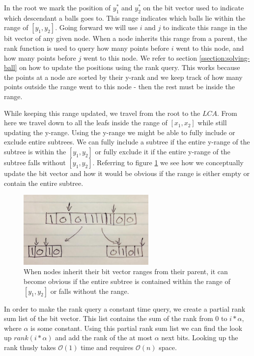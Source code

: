 In the root we mark the position of $y^*_1$ and $y^*_2$ on the bit vector used to indicate which descendant a balls goes to. This range indicates which balls lie within the range of $[y_1, y_2]$. Going forward we will use $i$ and $j$ to indicate this range in the bit vector of any given node. When  a node inherits this range from a parent, the rank function is used to query how many points before $i$ went to this node, and how many points before $j$ went to this node. We refer to section \ref{ssection:solving-ball} on how to update the positions using the rank query. This works because the points at a node are sorted by their y-rank and we keep track of how many points outside the range went to this node - then the rest must be inside the range.

While keeping this range updated, we travel from the root to the $LCA$. From here we travel down to all the leafs inside the range of $[x_1, x_2]$ while still updating the y-range. Using the y-range we might be able to fully include or exclude entire subtrees. We can fully include a subtree if the entire y-range of the subtree is within the $[y_1, y_2]$ or fully exclude it if the entire y-range of the subtree falls without $[y_1, y_2]$. Referring to figure \ref{fig:bitvectorsplit} we see how we conceptually update the bit vector and how it would be obvious if the range is either empty or contain the entire subtree.

\begin{figure}[p]
    \centering
    \includegraphics[width=0.6\textwidth]{pictures/bit_vector_split.png}
    \caption{When nodes inherit their bit vector ranges from their parent, it can become obvious if the entire subtree is contained within the range of $[y_1, y_2]$ or falls without the range.}
    \label{fig:bitvectorsplit}
\end{figure}


In order to make the rank query a constant time query, we create a partial rank sum list of the bit vector. This list contains the sum of the rank from $0$ to $i*\alpha$, where $\alpha$ is some constant. Using this partial rank sum list we can find the look up $rank(i*\alpha)$ and add the rank of the at most $\alpha$ next bits. Looking up the rank thusly takes $\mathcal{O}(1)$ time and requires $\mathcal{O}(n)$ space.

